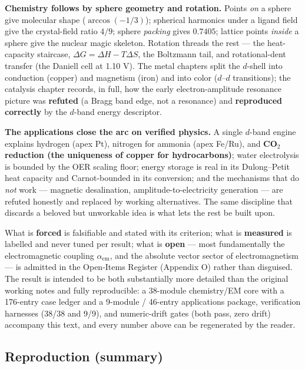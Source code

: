 \documentclass[
  10pt,
]{article}
\begin{document}
\textbf{Chemistry follows by sphere geometry and rotation.} Points
\emph{on} a sphere give molecular shape (\(\arccos(-1/3)\)); spherical
harmonics under a ligand field give the crystal-field ratio \(4/9\);
sphere \emph{packing} gives \(0.7405\); lattice points \emph{inside} a
sphere give the nuclear magic skeleton. Rotation threads the rest ---
the heat-capacity staircase, \(\Delta G = \Delta H - T\Delta S\), the
Boltzmann tail, and rotational-dent transfer (the Daniell cell at 1.10
V). The metal chapters split the \(d\)-shell into conduction (copper)
and magnetism (iron) and into color (\(d\)--\(d\) transitions); the
catalysis chapter records, in full, how the early electron-amplitude
resonance picture was \textbf{refuted} (a Bragg band edge, not a
resonance) and \textbf{reproduced correctly} by the \(d\)-band energy
descriptor.

\textbf{The applications close the arc on verified physics.} A single
\(d\)-band engine explains hydrogen (apex Pt), nitrogen for ammonia
(apex Fe/Ru), and \textbf{CO\(_2\) reduction (the uniqueness of copper
for hydrocarbons)}; water electrolysis is bounded by the OER scaling
floor; energy storage is real in its Dulong--Petit heat capacity and
Carnot-bounded in its conversion; and the mechanisms that do \emph{not}
work --- magnetic desalination, amplitude-to-electricity generation ---
are refuted honestly and replaced by working alternatives. The same
discipline that discards a beloved but unworkable idea is what lets the
rest be built upon.

What is \textbf{forced} is falsifiable and stated with its criterion;
what is \textbf{measured} is labelled and never tuned per result; what
is \textbf{open} --- most fundamentally the electromagnetic coupling
\(\alpha_{\mathrm{em}}\), and the absolute vector sector of
electromagnetism --- is admitted in the Open-Items Register (Appendix O)
rather than disguised. The result is intended to be both substantially
more detailed than the original working notes and fully reproducible: a
38-module chemistry/EM core with a 176-entry case ledger and a 9-module
/ 46-entry applications package, verification harnesses (38/38 and 9/9),
and numeric-drift gates (both pass, zero drift) accompany this text, and
every number above can be regenerated by the reader.

\hypertarget{reproduction-summary}{%
\subsection{Reproduction (summary)}\label{reproduction-summary}}
\end{document}
